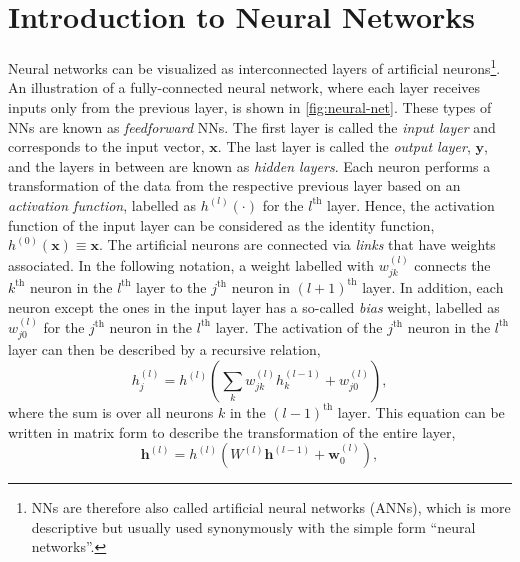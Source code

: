 \section{Introduction to Neural Networks}
\label{sec:intro-neural-nets}
Neural networks can be visualized as interconnected layers of artificial neurons\footnote{ NNs are therefore also called artificial neural networks (ANNs), which is more descriptive but usually used synonymously with the simple form ``neural networks''.}. An illustration of a fully-connected neural network, where each layer receives inputs only from the previous layer, is shown in \cref{fig:neural-net}. These types of NNs are known as \emph{feedforward} NNs.
The first layer is called the \emph{input layer} and corresponds to the input vector, $\mathbf{x}$. The last layer is called the \emph{output layer}, $\mathbf{y}$, and the layers in between are known as \emph{hidden layers}. Each neuron performs a transformation of the data from the respective previous layer based on an \emph{activation function}, labelled as $h^{(l)}(\cdot)$ for the $l^\text{th}$ layer.
Hence, the activation function of the input layer can be considered as the identity function, $h^{(0)}(\mathbf{x}) \equiv \mathbf{x}$.
The artificial neurons are connected via \emph{links} that have weights associated.
In the following notation, a weight labelled with $w^{(l)}_{jk}$ connects the $k^\text{th}$ neuron in the $l^\text{th}$ layer to the $j^\text{th}$ neuron in $(l+1)^\text{th}$ layer.
In addition, each neuron except the ones in the input layer has a so-called \emph{bias} weight, labelled as $w^{(l)}_{j0}$ for the $j^\text{th}$ neuron in the $l^\text{th}$ layer.
The activation of the $j^\text{th}$ neuron in the $l^{\text{th}}$ layer can then be described by a recursive relation,
\begin{equation}
    h^{(l)}_j =  h^{(l)} \left( \sum_{k}   w^{(l)}_{jk} h^{(l-1)}_{k}  + w^{(l)}_{j0} \right),
\end{equation}
where the sum is over all neurons $k$ in the $(l-1)^\text{th}$ layer.
This equation can be written in matrix form to describe the transformation of the entire layer,
\begin{equation}
    \label{eq:recursive-neuron-activation}
    \mathbf{h}^{(l)} =  h^{(l)} \left( W^{(l)} \mathbf{h}^{(l-1)}  + \mathbf{w}^{(l)}_{0} \right),
\end{equation}

